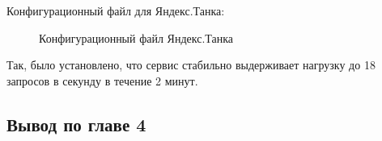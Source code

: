     Конфигурационный файл для Яндекс.Танка:
    \begin{figure}[H]
        \centering
        
        \caption{Конфигурационный файл Яндекс.Танка}
        \label{fig:tank-load}
    \end{figure}

    Так, было установлено, что сервис стабильно выдерживает нагрузку до 18
    запросов в секунду в течение 2 минут.

    \subsection*{Вывод по главе 4}
